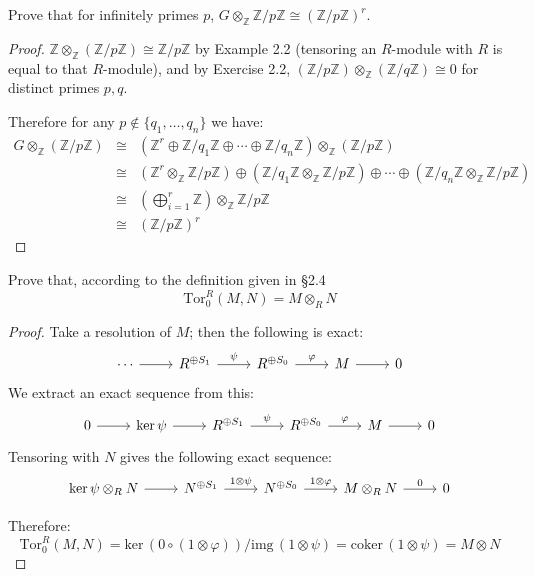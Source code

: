 \documentclass[12pt]{article}
\newcommand{\Z}{\mathbb{Z}}
\newcommand{\exercise}[1]{\noindent {\bf Exercise #1.}}
\newcommand{\tensor}[1]{\otimes_{#1}}
\newcommand{\kernel}[0]{\text{ker}\,}
\newcommand{\cokernel}[0]{\text{coker}\,}
\newcommand{\image}[0]{\text{img}\,}
\begin{document}
Prove that for infinitely primes $p$, $G \otimes_{\Z} \Z/p\Z \cong (\Z/p\Z)^{r}$.

\begin{proof}
$\Z \tensor{\Z} (\Z/p\Z) \cong \Z/p\Z$ by Example 2.2 (tensoring an $R$-module with $R$ is equal to that $R$-module), and by Exercise 2.2, $(\Z/p\Z) \tensor{\Z} (\Z/q\Z) \cong 0$ for distinct primes $p, q$.

Therefore for any $p \not\in \{q_1,\ldots,q_n\}$ we have:
    \begin{eqnarray*}
        G \tensor{\Z} (\Z/p\Z) &\cong& (\Z^{r} \oplus \Z/q_1\Z \oplus \cdots \oplus \Z/q_n\Z) \tensor{\Z} (\Z/p\Z) \\
                         &\cong& (\Z^{r} \tensor{\Z} \Z/p\Z) \oplus (\Z/q_1\Z \tensor{\Z} \Z/p\Z) \oplus \cdots \oplus (\Z/q_n\Z \tensor{\Z} \Z/p\Z) \\
                         &\cong& (\bigoplus_{i=1}^{r} \Z) \tensor{\Z} \Z/p\Z \\
                         &\cong& (\Z/p\Z)^r
    \end{eqnarray*}
\end{proof}

\exercise{2.14} Prove that, according to the definition given in \S 2.4 \[ \text{Tor}^{R}_0(M, N) = M \otimes_{R} N \]

\begin{proof}
Take a resolution of $M$; then the following is exact:
\[
\begin{tikzcd}
    \cdots \arrow[r] & R^{\oplus S_1} \arrow[r, "\psi"] & R^{\oplus S_0} \arrow[r, "\varphi"] & M \arrow[r] & 0
\end{tikzcd}
\]
We extract an exact sequence from this:
\[
\begin{tikzcd}
    0 \arrow[r] & \kernel \psi \arrow[r] & R^{\oplus S_1} \arrow[r, "\psi"] & R^{\oplus S_0} \arrow[r, "\varphi"] & M \arrow[r] & 0
\end{tikzcd}
\]
Tensoring with $N$ gives the following exact sequence:
\[
\begin{tikzcd}
    \kernel \psi \otimes_{R} N \arrow[r] & N^{\oplus S_1} \arrow[r, "1 \otimes \psi"] & N^{\oplus S_0} \arrow[r, "1 \otimes \varphi"] & M \otimes_{R} N \arrow[r, "0"] & 0
\end{tikzcd}
\]

Therefore: \[ \text{Tor}^{R}_0(M, N) = \kernel (0 \circ (1 \otimes \varphi)) / \image(1 \otimes \psi) = \cokernel (1 \otimes \psi) = M \otimes N \]

\end{proof}
\end{document}
